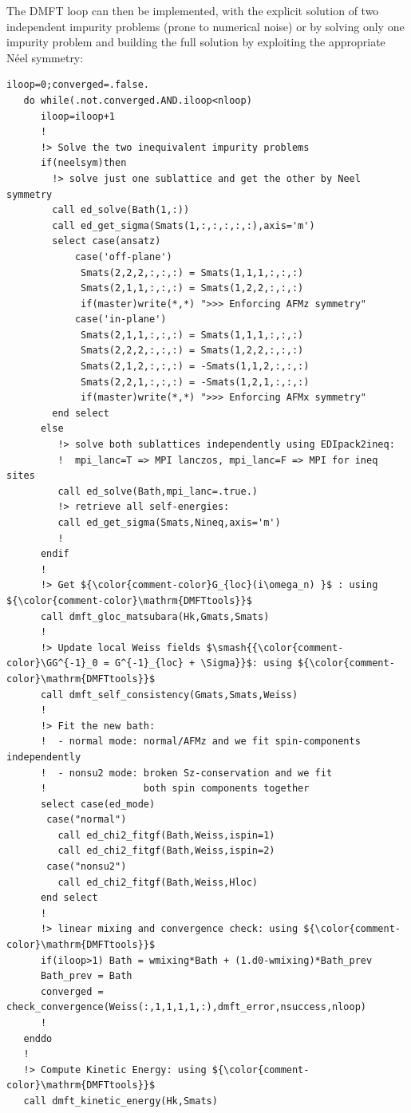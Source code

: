 \documentclass[edipack_sp.tex]{subfiles}
\begin{document}
The DMFT loop can then be implemented, with the explicit solution of two
independent impurity problems (prone to numerical noise) or by solving
only one impurity problem and building the full solution by exploiting 
the appropriate Néel symmetry:

\begin{lstlisting}[style=fstyle,numbers=none,basicstyle={\scriptsize\ttfamily}]
   iloop=0;converged=.false.
   do while(.not.converged.AND.iloop<nloop)
      iloop=iloop+1
      !
      !> Solve the two inequivalent impurity problems
      if(neelsym)then
        !> solve just one sublattice and get the other by Neel symmetry
        call ed_solve(Bath(1,:))
        call ed_get_sigma(Smats(1,:,:,:,:,:),axis='m')
        select case(ansatz)
            case('off-plane')
             Smats(2,2,2,:,:,:) = Smats(1,1,1,:,:,:) 
             Smats(2,1,1,:,:,:) = Smats(1,2,2,:,:,:) 
             if(master)write(*,*) ">>> Enforcing AFMz symmetry"
            case('in-plane')
             Smats(2,1,1,:,:,:) = Smats(1,1,1,:,:,:)   
             Smats(2,2,2,:,:,:) = Smats(1,2,2,:,:,:)   
             Smats(2,1,2,:,:,:) = -Smats(1,1,2,:,:,:)  
             Smats(2,2,1,:,:,:) = -Smats(1,2,1,:,:,:) 
             if(master)write(*,*) ">>> Enforcing AFMx symmetry"
        end select
      else
         !> solve both sublattices independently using EDIpack2ineq:
         !  mpi_lanc=T => MPI lanczos, mpi_lanc=F => MPI for ineq sites
         call ed_solve(Bath,mpi_lanc=.true.)
         !> retrieve all self-energies:
         call ed_get_sigma(Smats,Nineq,axis='m')
         !
      endif
      !
      !> Get ${\color{comment-color}G_{loc}(i\omega_n) }$ : using ${\color{comment-color}\mathrm{DMFTtools}}$
      call dmft_gloc_matsubara(Hk,Gmats,Smats)
      !
      !> Update local Weiss fields $\smash{{\color{comment-color}\GG^{-1}_0 = G^{-1}_{loc} + \Sigma}}$: using ${\color{comment-color}\mathrm{DMFTtools}}$
      call dmft_self_consistency(Gmats,Smats,Weiss)
      !
      !> Fit the new bath:
      !  - normal mode: normal/AFMz and we fit spin-components independently
      !  - nonsu2 mode: broken Sz-conservation and we fit
      !                 both spin components together
      select case(ed_mode)
       case("normal")
         call ed_chi2_fitgf(Bath,Weiss,ispin=1)
         call ed_chi2_fitgf(Bath,Weiss,ispin=2)
       case("nonsu2")
         call ed_chi2_fitgf(Bath,Weiss,Hloc)
      end select
      !
      !> linear mixing and convergence check: using ${\color{comment-color}\mathrm{DMFTtools}}$
      if(iloop>1) Bath = wmixing*Bath + (1.d0-wmixing)*Bath_prev
      Bath_prev = Bath
      converged = check_convergence(Weiss(:,1,1,1,1,:),dmft_error,nsuccess,nloop)
      !
   enddo
   !
   !> Compute Kinetic Energy: using ${\color{comment-color}\mathrm{DMFTtools}}$
   call dmft_kinetic_energy(Hk,Smats)
\end{lstlisting}
\end{document}
